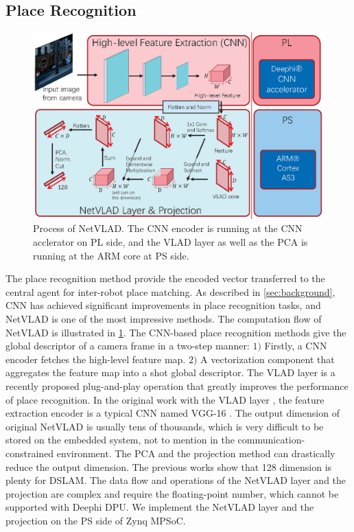 
\subsection{Place Recognition}

\begin{figure}[t]
    \centering  
    \includegraphics[width=0.95\linewidth]{fig/NetVLAD.eps}
    \caption{Process of NetVLAD. The CNN encoder is running at the CNN acclerator on PL side, and the VLAD layer as well as the PCA is running at the ARM core at PS side.}
    \label{fig:NetVLAD}
\end{figure}

The place recognition method provide the encoded vector transferred to the central agent for inter-robot place matching. As described in \cref{sec:background}, CNN has achieved significant improvements in place recognition tasks, and NetVLAD \cite{Arandjelovic:2017997} is one of the most impressive methods. The computation flow of NetVLAD is illustrated in \cref{fig:NetVLAD}. The CNN-based place recognition methods give the global descriptor of a camera frame in a two-step manner: $1)$ Firstly, a CNN encoder fetches the high-level feature map. $2)$ A vectorization component that aggregates the feature map into a shot global descriptor. The VLAD layer \cite{Arandjelovic:2017997} is a recently proposed plug-and-play operation that greatly improves the performance of place recognition. In the original work with the VLAD layer \cite{Arandjelovic:2017997}, the feature extraction encoder is a typical CNN named VGG-16 \cite{Simonyan:20143be}. The output dimension of original NetVLAD is usually tens of thousands, which is very difficult to be stored on the embedded system, not to mention in the communication-constrained environment. The PCA and the projection method can drastically reduce the output dimension. The previous works\cite{Cieslewski:20187ee} show that 128 dimension is plenty for DSLAM. The data flow and operations of the NetVLAD layer and the projection are complex and require the floating-point number, which cannot be supported with Deephi DPU. We implement the NetVLAD layer and the projection on the PS side of Zynq MPSoC.


